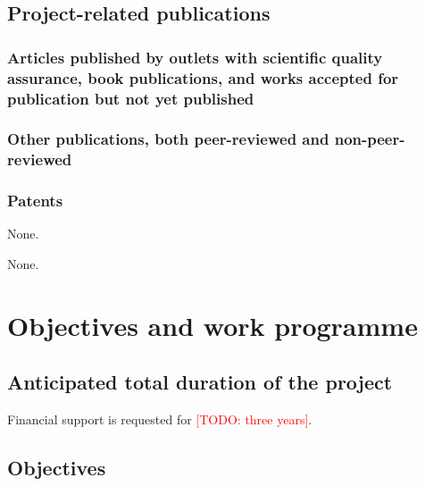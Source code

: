 \documentclass[ngerman,firsttime]{dfgproposal}
\newcommand{\todo}[1]{\xspace{\textcolor{red}{[TODO: #1]}}\xspace}
\begin{document}
	\blindtext[1]
	
	
	\subsection{Project-related publications}
	
	\subsubsection{Articles published by outlets with scientific quality assurance, book publications, and works accepted for publication but not yet published}
	\printbibliography[category=reviewed, heading=none]
	
	\subsubsection{Other publications, both peer-reviewed and non-peer-reviewed}
	\printbibliography[category=nonreviewed, heading=none]
	
	
	\subsubsection{Patents}
	
	\printbibliography[category=patents_pending, heading=none]
	None.
	
	\printbibliography[category=patents, heading=none]
	None.
	
	
	\section{Objectives and work programme}
	
	\subsection{Anticipated total duration of the project}
	Financial support is requested for \todo{three years}.
	
	\subsection{Objectives}
	
\end{document}
